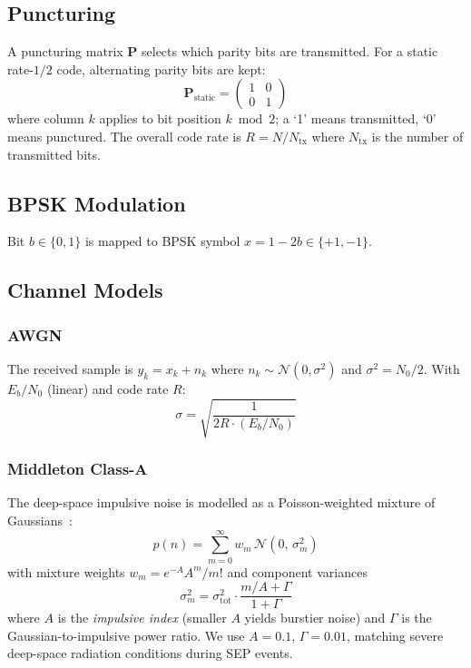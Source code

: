 \documentclass[journal,twocolumn]{IEEEtran}
\begin{document}
\subsection{Puncturing}
A puncturing matrix $\mathbf{P}$ selects which parity bits are
transmitted.  For a static rate-$1/2$ code, alternating parity bits are
kept:
\begin{equation}
  \mathbf{P}_{\text{static}} = \begin{pmatrix} 1 & 0 \\ 0 & 1 \end{pmatrix}
\end{equation}
where column $k$ applies to bit position $k \bmod 2$; a `1' means
transmitted, `0' means punctured.  The overall code rate is
$R = N / N_{\mathrm{tx}}$ where $N_{\mathrm{tx}}$ is the number of
transmitted bits.

\subsection{BPSK Modulation}
Bit $b \in \{0,1\}$ is mapped to BPSK symbol $x = 1 - 2b \in \{+1,-1\}$.

\subsection{Channel Models}
\subsubsection{AWGN}
The received sample is $y_k = x_k + n_k$ where $n_k \sim
\mathcal{N}(0, \sigma^2)$ and $\sigma^2 = N_0/2$.  With $E_b/N_0$
(linear) and code rate $R$:
\begin{equation}
  \sigma = \sqrt{\frac{1}{2 R \cdot (E_b/N_0)}}
\end{equation}

\subsubsection{Middleton Class-A}
The deep-space impulsive noise is modelled as a Poisson-weighted
mixture of Gaussians~\cite{middleton1977radiation}:
\begin{equation}
  p(n) = \sum_{m=0}^{\infty} w_m \,\mathcal{N}\!\left(0,\,\sigma_m^2\right)
\end{equation}
with mixture weights $w_m = e^{-A} A^m / m!$ and component variances
\begin{equation}
  \sigma_m^2 = \sigma_{\mathrm{tot}}^2 \cdot \frac{m/A + \Gamma}{1 + \Gamma}
\end{equation}
where $A$ is the \emph{impulsive index} (smaller $A$ yields burstier
noise) and $\Gamma$ is the Gaussian-to-impulsive power ratio.  We use
$A = 0.1$, $\Gamma = 0.01$, matching severe deep-space radiation
conditions during SEP events.
\end{document}
